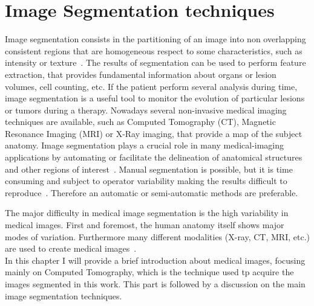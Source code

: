 \documentclass{standalone}
\begin{document}
	\chapter{Image Segmentation techniques}
	Image segmentation consists in the partitioning of an image into non overlapping consistent regions that are homogeneous respect to some characteristics, such as intensity or texture~\cite{ART:Pham}.
	The results of segmentation can be used to perform feature extraction, that provides fundamental information about organs or lesion volumes, cell counting, etc. If the patient perform several analysis during time, image segmentation is a useful tool to monitor the evolution of particular lesions or tumors during a therapy.
	Nowadays several non-invasive medical imaging techniques are available, such as Computed Tomography (CT), Magnetic Resonance Imaging (MRI) or X-Ray imaging, that provide a map of the subject anatomy. Image segmentation plays a crucial role in many medical-imaging applications by automating or facilitate the delineation of anatomical structures and other regions of interest~\cite{ART:Pham}.  Manual segmentation is  possible, but it is time consuming and subject to operator variability making the results difficult to reproduce~\cite{INP:Withey}. Therefore an automatic or semi-automatic methods are preferable. 
	
	The major difficulty in medical image segmentation is the high variability in medical images. First and foremost, the human anatomy itself shows major modes of variation. Furthermore many different modalities (X-ray, CT, MRI, etc.) are used to create medical images~\cite{ART:Pooja}.\\
	
	
	In this chapter I will provide a brief introduction about medical images, focusing mainly on Computed Tomography, which is the technique used tp acquire the images segmented in this work. 	
	This part is followed by a discussion on the main image segmentation techniques.
	
\end{document}
